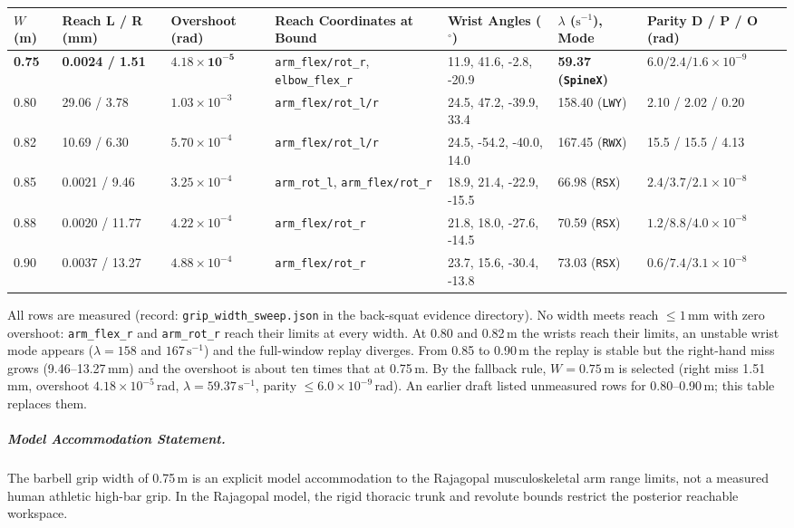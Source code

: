 \documentclass[11pt,a4paper]{article}
\begin{document}
\begin{center}\footnotesize\setlength{\tabcolsep}{2.5pt}
\begin{tabular}{lllllll}
\toprule
$W$ (m) & Reach L / R (mm) & Overshoot (rad) & Reach Coordinates at Bound & Wrist Angles ($^\circ$) & $\lambda$ ($\mathrm{s}^{-1}$), Mode & Parity D / P / O (rad)\\
\midrule
\textbf{0.75} & \textbf{0.0024 / 1.51} & $\mathbf{4.18\times 10^{-5}}$ & \texttt{arm\_flex/rot\_r}, \texttt{elbow\_flex\_r} & 11.9, 41.6, -2.8, -20.9 & \textbf{59.37 (\texttt{SpineX})} & $6.0/2.4/1.6\times 10^{-9}$\\
0.80 & 29.06 / 3.78 & $1.03\times 10^{-3}$ & \texttt{arm\_flex/rot\_l/r} & 24.5, 47.2, -39.9, 33.4 & 158.40 (\texttt{LWY}) & 2.10 / 2.02 / 0.20\\
0.82 & 10.69 / 6.30 & $5.70\times 10^{-4}$ & \texttt{arm\_flex/rot\_l/r} & 24.5, -54.2, -40.0, 14.0 & 167.45 (\texttt{RWX}) & 15.5 / 15.5 / 4.13\\
0.85 & 0.0021 / 9.46 & $3.25\times 10^{-4}$ & \texttt{arm\_rot\_l}, \texttt{arm\_flex/rot\_r} & 18.9, 21.4, -22.9, -15.5 & 66.98 (\texttt{RSX}) & $2.4/3.7/2.1\times 10^{-8}$\\
0.88 & 0.0020 / 11.77 & $4.22\times 10^{-4}$ & \texttt{arm\_flex/rot\_r} & 21.8, 18.0, -27.6, -14.5 & 70.59 (\texttt{RSX}) & $1.2/8.8/4.0\times 10^{-8}$\\
0.90 & 0.0037 / 13.27 & $4.88\times 10^{-4}$ & \texttt{arm\_flex/rot\_r} & 23.7, 15.6, -30.4, -13.8 & 73.03 (\texttt{RSX}) & $0.6/7.4/3.1\times 10^{-8}$\\
\bottomrule
\end{tabular}
\end{center}
All rows are measured (record: \texttt{grip\_width\_sweep.json} in the back-squat evidence directory).
No width meets reach $\le 1$\,mm with zero overshoot: \texttt{arm\_flex\_r} and \texttt{arm\_rot\_r}
reach their limits at every width. At 0.80 and 0.82\,m the wrists reach their limits, an unstable wrist
mode appears ($\lambda = 158$ and $167\,\mathrm{s}^{-1}$) and the full-window replay diverges. From 0.85
to 0.90\,m the replay is stable but the right-hand miss grows (9.46--13.27\,mm) and the overshoot is about
ten times that at 0.75\,m. By the fallback rule, $W = 0.75$\,m is selected (right miss 1.51\,mm, overshoot
$4.18\times 10^{-5}$\,rad, $\lambda = 59.37\,\mathrm{s}^{-1}$, parity $\le 6.0\times 10^{-9}$\,rad). An
earlier draft listed unmeasured rows for 0.80--0.90\,m; this table replaces them.

\subparagraph{Model Accommodation Statement.}
The barbell grip width of 0.75\,m is an explicit model accommodation to the Rajagopal musculoskeletal arm
range limits, not a measured human athletic high-bar grip. In the Rajagopal model, the rigid thoracic trunk and revolute bounds
restrict the posterior reachable workspace.
\end{document}

